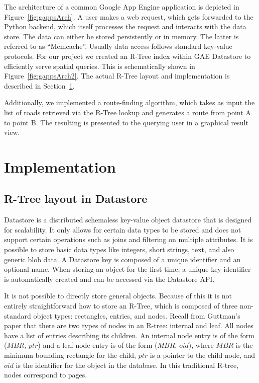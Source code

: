 \documentclass{scrartcl}
\begin{document}
The architecture of a common Google App Engine application is depicted in Figure~\ref{fig:gappsArch}. A user makes a web request, which gets forwarded to the Python backend, which itself processes the request and interacts with the data store. The data can either be stored persistently or in memory. The latter is referred to as ``Memcache''. Usually data access follows standard key-value protocols. For our project we created an R-Tree index within GAE Datastore to efficiently serve spatial queries. This is schematically shown in Figure~\ref{fig:gappsArch2}. The actual R-Tree layout and implementation is described in Section~\ref{sec:implementation}.

Additionally, we implemented a route-finding algorithm, which takes as input the list of roads retrieved via the R-Tree lookup and generates a route from point A to point B. The resulting is presented to the querying user in a graphical result view.


\section{Implementation}
\label{sec:implementation}
\subsection{R-Tree layout in Datastore}
Datastore is a distributed schemaless key-value object datastore that is designed for scalability. It only allows for certain data types to be stored and does not support certain operations such as joins and filtering on multiple attributes. It is possible to store basic data types like integers, short strings, text, and also generic blob data. A Datastore key is composed of a unique identifier and an optional name. When storing an object for the first time, a unique key identifier is automatically created and can be accessed via the Datastore API. 

It is not possible to directly store general objects. Because of this it is not entirely straightforward how to store an R-Tree, which is composed of three non-standard object types: rectangles, entries, and nodes. Recall from Guttman's paper\cite{DBLP:conf/sigmod/Guttman84} that there are two types of nodes in an R-tree: internal and leaf. All nodes have a list of entries describing its children. An internal node entry is of the form ($MBR$, $ptr$) and a leaf node entry is of the form ($MBR$, $oid$), where $MBR$ is the minimum bounding rectangle for the child, $ptr$ is a pointer to the child node, and $oid$ is the identifier for the object in the database. In this traditional R-tree, nodes correspond to pages.
\end{document}
